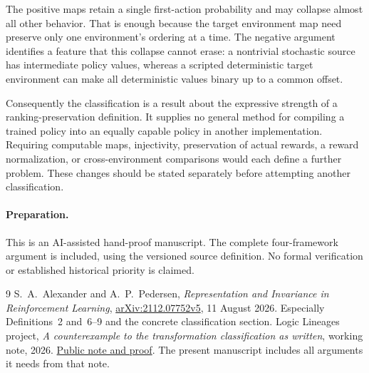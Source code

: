 \documentclass[11pt]{article}
\begin{document}
The positive maps retain a single first-action probability and may
collapse almost all other behavior. That is enough because the target
environment map need preserve only one environment's ordering at a
time. The negative argument identifies a feature that this collapse
cannot erase: a nontrivial stochastic source has intermediate policy
values, whereas a scripted deterministic target environment can make
all deterministic values binary up to a common offset.

Consequently the classification is a result about the expressive
strength of a ranking-preservation definition. It supplies no general
method for compiling a trained policy into an equally capable policy
in another implementation. Requiring computable maps, injectivity,
preservation of actual rewards, a reward normalization, or
cross-environment comparisons would each define a further problem.
These changes should be stated separately before attempting another
classification.

\paragraph{Preparation.}
This is an AI-assisted hand-proof manuscript. The complete four-framework
argument is included, using the versioned source definition. No formal
verification or established historical priority is claimed.

\begin{thebibliography}{9}
 S.~A.~Alexander and A.~P.~Pedersen,
\emph{Representation and Invariance in Reinforcement Learning},
\href{https://arxiv.org/abs/2112.07752v5}{arXiv:2112.07752v5},
11 August 2026. Especially Definitions~2 and~6--9 and the concrete
classification section.
 Logic Lineages project,
\emph{A counterexample to the transformation classification as written},
working note, 2026.
\href{https://github.com/avg-netizen/alexander-open-problems-results/tree/main/05-rl-transformation-counterexample}{Public note and proof}.
The present manuscript includes all arguments it needs from that note.
\end{thebibliography}
\end{document}

